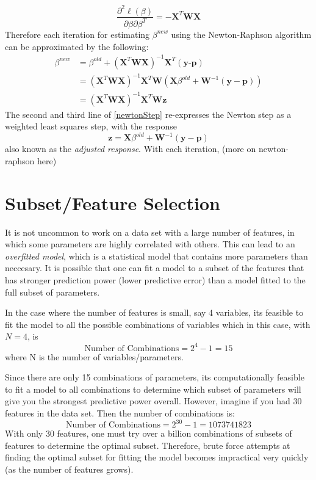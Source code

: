 \documentclass{article}
\numberwithin{equation}{subsection}
\begin{document}
\begin{equation}
  \dfrac{\partial^{2}\ell(\beta)}{\partial \beta \partial \beta^{T}} = -\textbf{X}^{T}\textbf{WX}
\end{equation}
Therefore each iteration for estimating $\beta^{new}$ using the Newton-Raphson algorithm can be 
approximated by the following: 
\begin{equation}
  \label{newtonStep}
  \begin{split}
    \beta^{new} & = \beta^{old} + (\textbf{X}^{T}\textbf{WX})^{-1}\textbf{X}^{T}(\textbf{y-p}) \\
                & = (\textbf{X}^{T}\textbf{WX})^{-1}\textbf{X}^{T}\textbf{W}(\textbf{X}\beta^{old} + \textbf{W}^{-1}(\textbf{y} - \textbf{p})) \\
                & = (\textbf{X}^{T}\textbf{WX})^{-1}\textbf{X}^{T}\textbf{Wz}
  \end{split}
\end{equation}
The second and third line of \eqref{newtonStep} re-expresses the Newton step as a weighted least 
squares step, with the response
\begin{equation}
  \textbf{z} = \textbf{X} \beta^{old} + \textbf{W}^{-1}(\textbf{y} - \textbf{p})
\end{equation}
also known as the \textit{adjusted response}. With each iteration, (more on newton-raphson here)

\pagebreak
\section{Subset/Feature Selection}
It is not uncommon to work on a data set with a large number of features, in which some parameters 
are highly correlated with others.
This can lead to an \textit{overfitted model}, which is a statistical model that contains more 
parameters than neccesary. It is possible that one can fit a model to a subset of the features that has
stronger prediction power (lower predictive error) than a model fitted to the full subset of parameters.

In the case where the number of features is small, say 4 variables, its feasible to fit the model
to all the possible combinations of variables which in this case, with $N = 4$, is
\begin{equation}
  \text{Number of Combinations} = 2^{4} - 1 = 15
\end{equation}
where N is the number of variables/parameters.

Since there are only 15 combinations of parameters, its computationally feasible to fit a model to all combinations 
to determine which subset of parameters will give you the strongest predictive power overall. However, imagine if you
had 30 features in the data set. Then the number of combinations is:
\begin{equation}
  \text{Number of Combinations} = 2^{30} - 1 = 1073741823
\end{equation} 
With only 30 features, one must try over a billion combinations of subsets of features to determine the optimal
subset. Therefore, brute force attempts at finding the optimal subset for fitting the model becomes impractical
very quickly (as the number of features grows). 
\end{document}
